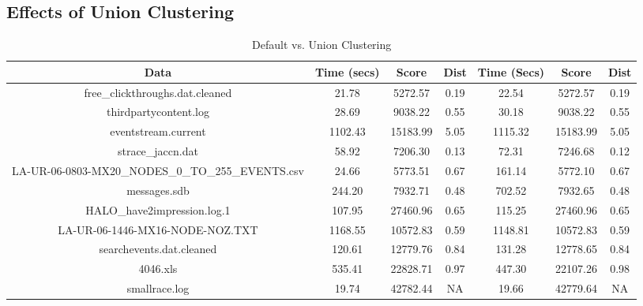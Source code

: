 \subsection{Effects of Union Clustering}
\begin{table*}[th]
\centering
\caption{Default vs. Union Clustering}
\label{tab:uceffects}
\begin{tabular}{|c||c|c|c||c|c|c|} \hline
Data & Time (secs) & Score & Dist & Time (Secs) & Score & Dist \\ \hline \hline
free\_clickthroughs.dat.cleaned & 21.78 & 5272.57 & 0.19 & 22.54 & 5272.57 & 0.19 \\ \hline
thirdpartycontent.log & 28.69 & 9038.22 & 0.55 & 30.18 & 9038.22 & 0.55 \\ \hline
eventstream.current & 1102.43 & 15183.99 & 5.05 & 1115.32 & 15183.99 & 5.05 \\ \hline
strace\_jaccn.dat & 58.92 & 7206.30 & 0.13 & 72.31 & 7246.68 & 0.12 \\ \hline
LA-UR-06-0803-MX20\_NODES\_0\_TO\_255\_EVENTS.csv & 24.66 & 5773.51 & 0.67 & 161.14 & 5772.10 & 0.67 \\ \hline
messages.sdb & 244.20 & 7932.71 & 0.48 & 702.52 & 7932.65 & 0.48 \\ \hline
HALO\_have2impression.log.1 & 107.95 & 27460.96 & 0.65 & 115.25 & 27460.96 & 0.65 \\ \hline
LA-UR-06-1446-MX16-NODE-NOZ.TXT & 1168.55 & 10572.83 & 0.59 & 1148.81 & 10572.83 & 0.59 \\ \hline
searchevents.dat.cleaned & 120.61 & 12779.76 & 0.84 & 131.28 & 12778.65 & 0.84 \\ \hline
4046.xls & 535.41 & 22828.71 & 0.97 & 447.30 & 22107.26 & 0.98 \\ \hline
smallrace.log & 19.74 & 42782.44 & NA & 19.66 & 42779.64 & NA \\ \hline
\end{tabular}
\end{table*}

